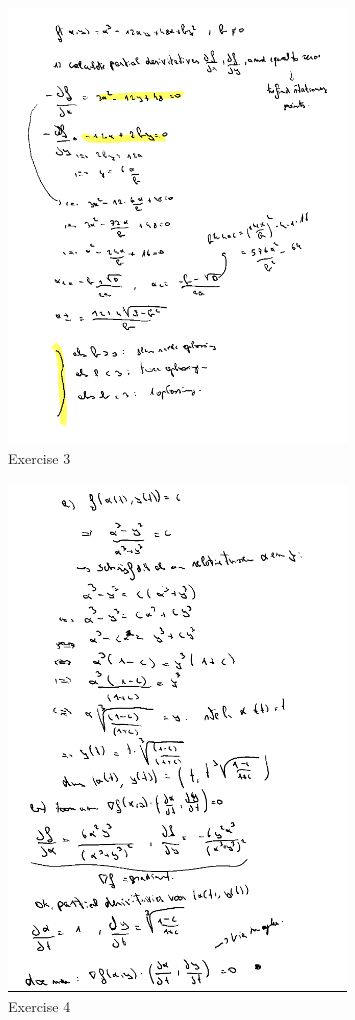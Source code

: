 \documentclass[a4paper]{report}
\begin{document}
\begin{figure}[H]
	\centering
	\includegraphics[width=0.8\textwidth]{assets/huis_4_ex_3.png}
	\caption{Exercise 3}
	\label{fig:huis_4_ex_3}
\end{figure}

\begin{figure}[H]
	\centering
	\includegraphics[width=0.8\textwidth]{assets/huis_4_ex_4.png}
	\caption{Exercise 4}
	\label{fig:huis_4_ex_4}
\end{figure}
\end{document}
